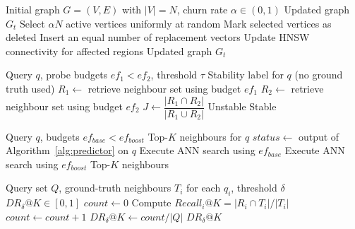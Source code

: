 \documentclass{ieeeaccess}
\begin{document}
\begin{algorithm}[!t]
\caption{Dynamic Graph Churn Simulation (offline, experimental)}
\label{alg:churn}
\begin{algorithmic}[1]
\Require Initial graph $G=(V,E)$ with $|V|=N$, churn rate $\alpha \in (0,1)$
\Ensure Updated graph $G_t$
\State Select $\alpha N$ active vertices uniformly at random
\State Mark selected vertices as deleted
\State Insert an equal number of replacement vectors \cite{Xu2023, CleanNN2025}
\State Update HNSW connectivity for affected regions \cite{Malkov2020}
\State \Return Updated graph $G_t$
\end{algorithmic}
\end{algorithm}

\begin{algorithm}[!t]
\caption{Oracle-Free Query Instability Prediction}
\label{alg:predictor}
\begin{algorithmic}[1]
\Require Query $q$, probe budgets $ef_1 < ef_2$, threshold $\tau$
\Ensure Stability label for $q$ (no ground truth used)
\State $R_1 \gets$ retrieve neighbour set using budget $ef_1$
\State $R_2 \gets$ retrieve neighbour set using budget $ef_2$
\State $J \gets \dfrac{|R_1\cap R_2|}{|R_1\cup R_2|}$
  \State \Return Unstable
\Else
  \State \Return Stable
\EndIf
\end{algorithmic}
\end{algorithm}

\begin{algorithm}[!t]
\caption{Adaptive Query-Time Recovery}
\label{alg:adaptive}
\begin{algorithmic}[1]
\Require Query $q$, budgets $ef_{base} < ef_{boost}$
\Ensure Top-$K$ neighbours for $q$
\State $status \gets$ output of Algorithm~\ref{alg:predictor} on $q$
  \State Execute ANN search using $ef_{base}$
\Else
  \State Execute ANN search using $ef_{boost}$
\EndIf
\State \Return Top-$K$ neighbours
\end{algorithmic}
\end{algorithm}

\begin{algorithm}[!t]
\caption{Dynamic Robustness-$\delta@K$ Evaluation (offline, requires ground truth)}
\label{alg:robustness}
\begin{algorithmic}[1]
\Require Query set $Q$, ground-truth neighbours $T_i$ for each $q_i$, threshold $\delta$
\Ensure $DR_{\delta}@K \in [0,1]$
\State $count \gets 0$
  \State Compute $Recall_i@K = |R_i \cap T_i| / |T_i|$
    \State $count \gets count + 1$
  \EndIf
\EndFor
\State $DR_{\delta}@K \gets count / |Q|$
\State \Return $DR_{\delta}@K$
\end{algorithmic}
\end{algorithm}
\end{document}
